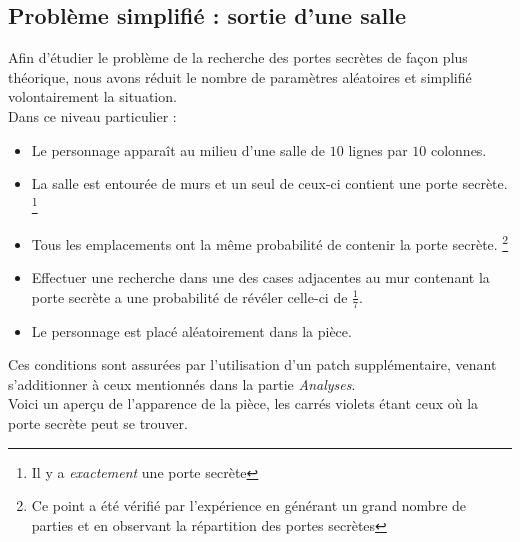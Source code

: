 \documentclass[a4paper,12pt]{article}
\begin{document}
\subsection{Problème simplifié : sortie d'une salle}

Afin d'étudier le problème de la recherche des portes secrètes de façon plus
théorique, nous avons réduit le nombre de paramètres aléatoires et simplifié
volontairement la situation.
\\
Dans ce niveau particulier :
\begin{itemize}
\item Le personnage apparaît au milieu d'une salle de $10$ lignes par $10$
  colonnes.
\item La salle est entourée de murs et un seul de ceux-ci contient une porte
  secrète.
  \footnote{Il y a {\em exactement} une porte secrète}
\item Tous les emplacements ont la même probabilité de contenir la porte
  secrète.
  \footnote{Ce point a été vérifié par l'expérience en générant un grand nombre
    de parties et en observant la répartition des portes secrètes}
\item Effectuer une recherche dans une des cases adjacentes au mur contenant la
  porte secrète a une probabilité de révéler celle-ci de $\frac{1}{7}$.
\item Le personnage est placé aléatoirement dans la pièce.
\end{itemize}

Ces conditions sont assurées par l'utilisation d'un patch supplémentaire, venant
s'additionner à ceux mentionnés dans la partie {\em Analyses}.
\\
Voici un aperçu de l'apparence de la pièce, les carrés violets étant ceux où la
porte secrète peut se trouver.

\begin{center}
\end{center}
\end{document}
